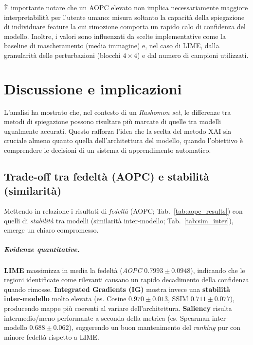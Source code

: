 \documentclass[12pt,a4paper,oneside]{report}
\numberwithin{figure}{chapter}
\numberwithin{table}{chapter}
\begin{document}
È importante notare che un AOPC elevato non implica necessariamente maggiore interpretabilità per l’utente umano: misura soltanto la capacità della spiegazione di individuare feature la cui rimozione comporta un rapido calo di confidenza del modello. Inoltre, i valori sono influenzati da scelte implementative come la baseline di mascheramento (media immagine) e, nel caso di LIME, dalla granularità delle perturbazioni (blocchi $4\times4$) e dal numero di campioni utilizzati.

\chapter{Discussione e implicazioni}

L’analisi ha mostrato che, nel contesto di un \emph{Rashomon set}, le
differenze tra metodi di spiegazione possono risultare più marcate di quelle
tra modelli ugualmente accurati. Questo rafforza l’idea che la scelta del
metodo XAI sia cruciale almeno quanto quella dell’architettura del modello,
quando l’obiettivo è comprendere le decisioni di un sistema di apprendimento
automatico.

\section{Trade-off tra fedeltà (AOPC) e stabilità (similarità)}
\label{sec:disc-tradeoff}

Mettendo in relazione i risultati di \emph{fedeltà} (AOPC;
Tab.~\ref{tab:aopc_results}) con quelli di \emph{stabilità} tra modelli
(similarità inter-modello; Tab.~\ref{tab:sim_inter}), emerge un chiaro
compromesso.

\paragraph{Evidenze quantitative.}
\textbf{LIME} massimizza in media la fedeltà (\emph{AOPC} $0.7993 \pm 0.0948$), indicando che le
regioni identificate come rilevanti causano un rapido decadimento della confidenza quando rimosse.
\textbf{Integrated Gradients (IG)} mostra invece una \textbf{stabilità inter-modello} molto elevata
(es. Cosine $0.970 \pm 0.013$, SSIM $0.711 \pm 0.077$), producendo mappe più coerenti al variare
dell’architettura. \textbf{Saliency} risulta intermedio/meno performante a seconda della metrica
(es. Spearman inter-modello $0.688 \pm 0.062$), suggerendo un buon mantenimento del \emph{ranking}
pur con minore fedeltà rispetto a LIME.
\end{document}
